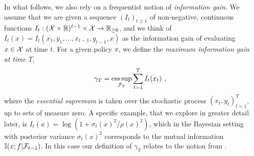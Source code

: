 In what follows, we also rely on a frequentist notion of \emph{information gain}. We assume that we are given a sequence $(I_t)_{t\geq 1}$ of non-negative, continuous functions  $I_t : (\mathcal{X} \times \mathbb{R})^{t-1} \times \mathcal{X} \rightarrow \mathbb{R}_{\geq 0}$, and we think of $I_t(x) = I_t(x_1, y_1, \dots, x_{t-1}, y_{t-1}, x)$ as the information gain of evaluating $x \in \mathcal{X}$ at time $t$. For a given policy $\pi$, we define the \emph{maximum information gain at time $T$},
\begin{align}
\gamma_T = \operatorname*{ess\,sup}_{\mathcal{F}_T}\sum_{t=1}^T I_t(x_t) \text{ ,} 
\end{align}
where the \emph{essential supremum} is taken over the stochastic process $(x_t,y_t)_{t=1}^T$, up to sets of measure zero. A specific example, that we explore in greater detail later, is $I_t(x) = \log(1 + {\sigma_t(x)^2}/{\rho(x)^2})$, which in the Bayesian setting with posterior variance $\sigma_t(x)^2$ corresponds to the mutual information $\mathbb{I}(x;f|\mathcal{F}_{t-1})$. In this case our definition of $\gamma_T$ relates to the notion from \cite{SrinivasGaussianProcessOptimization2010}.

